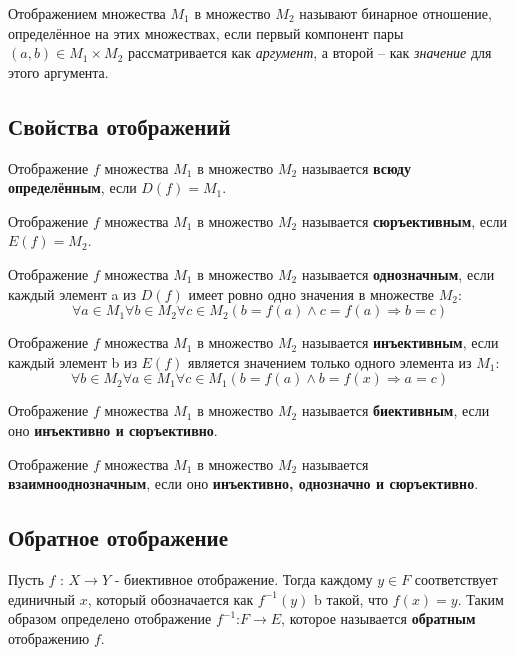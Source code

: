 \documentclass[a4paper]{article}
\begin{document}
Отображением
множества $M_1$ в множество $M_2$ называют бинарное отношение, определённое на
этих множествах, если первый компонент пары $(a, b) \in M_1 \times M_2$ рассматривается как \textit{аргумент}, а второй – как \textit{значение} для этого аргумента.

\subsection*{Свойства отображений}

Отображение $f$ множества $M_1$ в множество $M_2$ называется
\textbf{всюду определённым}, если $D(f) = M_1$.

Отображение $f$ множества $M_1$ в множество $M_2$ называется
\textbf{сюръективным}, если $E(f) = M_2$. 

Отображение $f$ множества $M_1$ в множество $M_2$ называется
\textbf{однозначным}, если каждый элемент a из $D(f)$ имеет ровно одно значения в множестве $M_2$:
\begin{equation}
\forall a \in M_1 \forall b \in M_2 \forall c \in M_2 (b  = f(a) \land c = f(a) \Rightarrow b = c)
\end{equation}


Отображение $f$ множества $M_1$ в множество $M_2$ называется
\textbf{инъективным}, если каждый элемент b из $E(f)$ является значением только одного элемента из $M_1$:
\begin{equation}
\forall b \in M_2 \forall a \in M_1 \forall c \in M_1 (b = f(a) \land b = f(x) \Rightarrow a = c)
\end{equation}

Отображение $f$ множества $M_1$ в множество $M_2$ называется
\textbf{биективным}, если оно \textbf{инъективно и сюръективно}. 

Отображение $f$ множества $M_1$ в множество $M_2$ называется
\textbf{взаимнооднозначным}, если оно \textbf{инъективно, однозначно и сюръективно}.

\subsection*{Обратное отображение
}
Пусть $f$ : $X \rightarrow Y$ - биективное отображение. Тогда каждому $y \in F$ соответствует единичный $x$, который обозначается как $f^{-1} (y)$ b такой, что $f(x) = y$. Таким образом определено отображение $f^{-1}$:$F \rightarrow E$, которое называется \textbf{обратным} отображению $f$.
\end{document}
